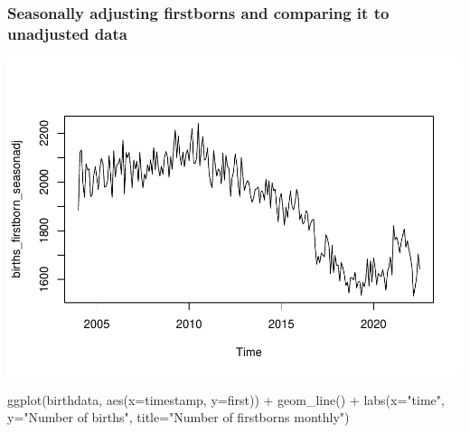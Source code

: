 \documentclass[
]{article}
\newenvironment{Shaded}{\begin{snugshade}}{\end{snugshade}}
\newcommand{\AttributeTok}[1]{\textcolor[rgb]{0.77,0.63,0.00}{#1}}
\newcommand{\FunctionTok}[1]{\textcolor[rgb]{0.00,0.00,0.00}{#1}}
\newcommand{\NormalTok}[1]{#1}
\newcommand{\OtherTok}[1]{\textcolor[rgb]{0.56,0.35,0.01}{#1}}
\newcommand{\SpecialCharTok}[1]{\textcolor[rgb]{0.00,0.00,0.00}{#1}}
\newcommand{\StringTok}[1]{\textcolor[rgb]{0.31,0.60,0.02}{#1}}
\begin{document}
\hypertarget{seasonally-adjusting-firstborns-and-comparing-it-to-unadjusted-data}{%
\subsubsection{Seasonally adjusting firstborns and comparing it to
unadjusted
data}\label{seasonally-adjusting-firstborns-and-comparing-it-to-unadjusted-data}}

\begin{Shaded}
\end{Shaded}

\includegraphics{GoogleTrendsMarkdown_files/figure-latex/unnamed-chunk-5-1.pdf}

\begin{Shaded}
\begin{Highlighting}[]
\FunctionTok{ggplot}\NormalTok{(birthdata, }\FunctionTok{aes}\NormalTok{(}\AttributeTok{x=}\NormalTok{timestamp, }\AttributeTok{y=}\NormalTok{first)) }\SpecialCharTok{+} \FunctionTok{geom\_line}\NormalTok{() }\SpecialCharTok{+} \FunctionTok{labs}\NormalTok{(}\AttributeTok{x=}\StringTok{"time"}\NormalTok{, }\AttributeTok{y=}\StringTok{"Number of births"}\NormalTok{, }\AttributeTok{title=}\StringTok{"Number of firstborns monthly"}\NormalTok{) }
\end{Highlighting}
\end{Shaded}
\end{document}
